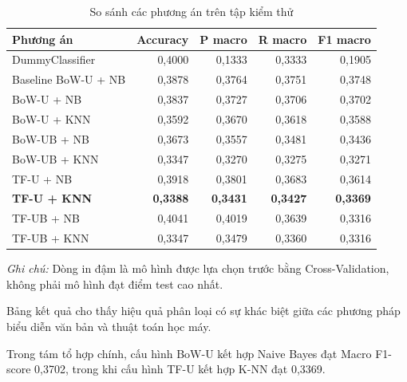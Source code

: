 \begin{table}[H]
\centering
\caption{So sánh các phương án trên tập kiểm thử}
\label{tab:ch4-ketqua-test}
\renewcommand{\arraystretch}{1.12}
\small
\setlength{\tabcolsep}{4pt}

\begin{tabularx}{\textwidth}{|X|r|r|r|r|}
\hline
\textbf{Phương án}
& \textbf{Accuracy}
& \textbf{P macro}
& \textbf{R macro}
& \textbf{F1 macro} \\
\hline

DummyClassifier
& 0,4000 & 0,1333 & 0,3333 & 0,1905 \\
\hline

Baseline BoW-U + NB
& 0,3878 & 0,3764 & 0,3751 & 0,3748 \\
\hline

BoW-U + NB
& 0,3837 & 0,3727 & 0,3706 & 0,3702 \\
\hline

BoW-U + KNN
& 0,3592 & 0,3670 & 0,3618 & 0,3588 \\
\hline

BoW-UB + NB
& 0,3673 & 0,3557 & 0,3481 & 0,3436 \\
\hline

BoW-UB + KNN
& 0,3347 & 0,3270 & 0,3275 & 0,3271 \\
\hline

TF-U + NB
& 0,3918 & 0,3801 & 0,3683 & 0,3614 \\
\hline

\textbf{TF-U + KNN}
& \textbf{0,3388}
& \textbf{0,3431}
& \textbf{0,3427}
& \textbf{0,3369} \\
\hline

TF-UB + NB
& 0,4041 & 0,4019 & 0,3639 & 0,3316 \\
\hline

TF-UB + KNN
& 0,3347 & 0,3479 & 0,3360 & 0,3316 \\
\hline

\end{tabularx}
\end{table}

\noindent
\textit{Ghi chú:} Dòng in đậm là mô hình được
lựa chọn trước bằng Cross-Validation, không
phải mô hình đạt điểm test cao nhất.

Bảng kết quả cho thấy hiệu quả phân loại có
sự khác biệt giữa các phương pháp biểu diễn
văn bản và thuật toán học máy.

Trong tám tổ hợp chính, cấu hình BoW-U kết hợp
Naive Bayes đạt Macro F1-score 0,3702,
trong khi cấu hình TF-U kết hợp K-NN đạt 0,3369.

